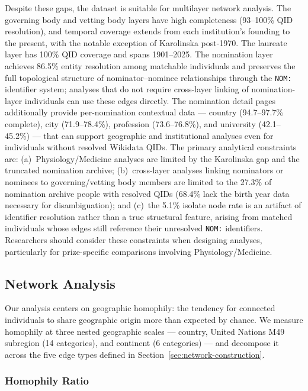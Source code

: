 \documentclass[11pt]{article}
\begin{document}
Despite these gaps, the dataset is suitable for multilayer network analysis. The governing body and vetting body layers have high completeness (93--100\% QID resolution), and temporal coverage extends from each institution's founding to the present, with the notable exception of Karolinska post-1970. The laureate layer has 100\% QID coverage and spans 1901--2025. The nomination layer achieves 86.5\% entity resolution among matchable individuals and preserves the full topological structure of nominator--nominee relationships through the \texttt{NOM:} identifier system; analyses that do not require cross-layer linking of nomination-layer individuals can use these edges directly. The nomination detail pages additionally provide per-nomination contextual data --- country (94.7--97.7\% complete), city (71.9--78.4\%), profession (73.6--76.8\%), and university (42.1--45.2\%) --- that can support geographic and institutional analyses even for individuals without resolved Wikidata QIDs. The primary analytical constraints are: (a)~Physiology/Medicine analyses are limited by the Karolinska gap and the truncated nomination archive; (b)~cross-layer analyses linking nominators or nominees to governing/vetting body members are limited to the 27.3\% of nomination archive people with resolved QIDs (68.4\% lack the birth year data necessary for disambiguation); and (c)~the 5.1\% isolate node rate is an artifact of identifier resolution rather than a true structural feature, arising from matched individuals whose edges still reference their unresolved \texttt{NOM:} identifiers. Researchers should consider these constraints when designing analyses, particularly for prize-specific comparisons involving Physiology/Medicine.

\subsection{Network Analysis}
\label{sec:analysis}

Our analysis centers on geographic homophily: the tendency for connected individuals to share geographic origin more than expected by chance. We measure homophily at three nested geographic scales --- country, United Nations M49 subregion (14 categories), and continent (6 categories) --- and decompose it across the five edge types defined in Section~\ref{sec:network-construction}.

\subsubsection{Homophily Ratio}
\end{document}
